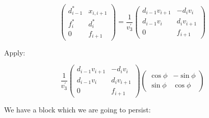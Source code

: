 \documentclass{article}
\begin{document}
$$
\left(\begin{matrix}
    d_{i-1}^* & x_{i,i+1} \\
    f_i^* & d_i^* \\
    0 & f_{i+1}
\end{matrix}\right)
=
\frac{1}{v_3^\prime}
\left(\begin{matrix}
    d_{i-1} v_{i+1} & -d_i v_i \\
    d_{i-1} v_i & d_i v_{i+1} \\
    0 & f_{i+1}
\end{matrix}\right)
$$

Apply:

$$
\frac{1}{v_3^\prime}
\left(\begin{matrix}
    d_{i-1} v_{i+1} & -d_i v_i \\
    d_{i-1} v_i & d_i v_{i+1} \\
    0 & f_{i+1}
\end{matrix}\right)
\left(\begin{matrix}
    \cos\phi & -\sin\phi \\
    \sin\phi & \cos\phi
\end{matrix}\right)
$$

We have a block which we are going to persist:
\end{document}
